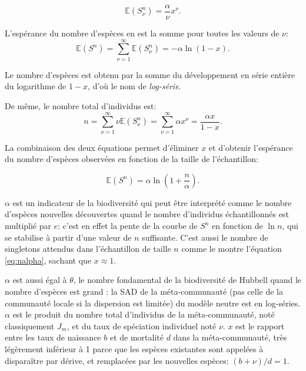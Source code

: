 \documentclass[
  11pt,
  french,
  a4paper,
  extrafontsizes,onecolumn,openright
  ]{memoir}
\begin{document}
\begin{equation}
  \label{eq:nalpha}
  {\mathbb E}\left(S^{n}_{\nu}\right) = \frac{\alpha}{\nu} x^\nu.
\end{equation}

L'espérance du nombre d'espèces en est la somme pour toutes les valeurs de \(\nu\):
\begin{equation}
  \label{eq:EspSn}
  {\mathbb E}\left(S^{n}\right) 
  = \sum_{\nu=1}^{\infty}{{\mathbb E}\left(S^{n}_{\nu}\right)}
  = -\alpha \ln(1-x).
\end{equation}

Le nombre d'espèces est obtenu par la somme du développement en série entière du logarithme de \(1-x\), d'où le nom de \emph{log-série}.

De même, le nombre total d'individus est:
\begin{equation}
  \label{eq:nlogserie}
  n = \sum_{\nu=1}^{\infty}{\nu {\mathbb E}\left(S^{n}_{\nu}\right)}
    = \sum_{\nu=1}^{\infty}{\alpha x^\nu} 
    = \frac{\alpha x}{1-x}.
\end{equation}

La combinaison des deux équations permet d'éliminer \(x\) et d'obtenir l'espérance du nombre d'espèces observées en fonction de la taille de l'échantillon:

\begin{equation}
  \label{eq:AlphaFisher}
  {\mathbb E}\left( S^n \right) = \alpha\ln \left( 1 + \frac{n}{\alpha} \right).
\end{equation}

\(\alpha\) est un indicateur de la biodiversité qui peut être interprété comme le nombre d'espèces nouvelles découvertes quand le nombre d'individus échantillonnés est multiplié par \(e\): c'est en effet la pente de la courbe de \(S^{n}\) en fonction de \(\ln n\), qui se stabilise à partir d'une valeur de \(n\) suffisante.
C'est aussi le nombre de singletons attendus dans l'échantillon de taille \(n\) comme le montre l'équation \eqref{eq:nalpha}, sachant que \(x \approx 1\).

\(\alpha\) est aussi égal à \(\theta\), le nombre fondamental de la biodiversité de Hubbell quand le nombre d'espèces est grand \autocite{Alonso2004}: la SAD de la méta-communauté (pas celle de la communauté locale si la dispersion est limitée) du modèle neutre est en log-séries.
\(\alpha\) est le produit du nombre total d'individus de la méta-communauté, noté classiquement \(J_m\), et du taux de spéciation individuel noté \(\nu\).
\(x\) est le rapport entre les taux de naissance \(b\) et de mortalité \(d\) dans la méta-communauté, très légèrement inférieur à 1 parce que les espèces existantes sont appelées à disparaître par dérive, et remplacées par les nouvelles espèces: \({(b+\nu)}/{d}=1\).
\end{document}
